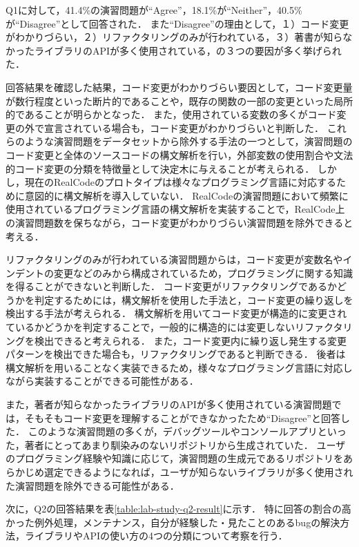 Q1に対して，41.4\%の演習問題が``Agree''，18.1\%が``Neither''，40.5\%が``Disagree''として回答された．
また``Disagree''の理由として，１）コード変更がわかりづらい，２）リファクタリングのみが行われている，３）著書が知らなかったライブラリのAPIが多く使用されている，の３つの要因が多く挙げられた．

回答結果を確認した結果，コード変更がわかりづらい要因として，コード変更量が数行程度といった断片的であることや，既存の関数の一部の変更といった局所的であることが明らかとなった．
また，使用されている変数の多くがコード変更の外で宣言されている場合も，コード変更がわかりづらいと判断した．
これらのような演習問題をデータセットから除外する手法の一つとして，演習問題のコード変更と全体のソースコードの構文解析を行い，外部変数の使用割合や文法的コード変更の分類を特徴量として決定木に与えることが考えられる．
しかし，現在のRealCodeのプロトタイプは様々なプログラミング言語に対応するために意図的に構文解析を導入していない．
RealCodeの演習問題において頻繁に使用されているプログラミング言語の構文解析を実装することで，RealCode上の演習問題数を保ちながら，コード変更がわかりづらい演習問題を除外できると考える．

リファクタリングのみが行われている演習問題からは，コード変更が変数名やインデントの変更などのみから構成されているため，プログラミングに関する知識を得ることができないと判断した．
コード変更がリファクタリングであるかどうかを判定するためには，構文解析を使用した手法と，コード変更の繰り返しを検出する手法が考えられる．
構文解析を用いてコード変更が構造的に変更されているかどうかを判定することで，一般的に構造的には変更しないリファクタリングを検出できると考えられる．
また，コード変更内に繰り返し発生する変更パターンを検出できた場合も，リファクタリングであると判断できる．
後者は構文解析を用いることなく実装できるため，様々なプログラミング言語に対応しながら実装することができる可能性がある．

また，著者が知らなかったライブラリのAPIが多く使用されている演習問題では，そもそもコード変更を理解することができなかったため``Disagree''と回答した．
このような演習問題の多くが，デバッグツールやコンソールアプリといった，著者にとってあまり馴染みのないリポジトリから生成されていた．
ユーザのプログラミング経験や知識に応じて，演習問題の生成元であるリポジトリをあらかじめ選定できるようになれば，ユーザが知らないライブラリが多く使用された演習問題を除外できる可能性がある．

次に，Q2の回答結果を表\ref{table:lab-study-q2-result}に示す．
特に回答の割合の高かった例外処理，メンテナンス，自分が経験した・見たことのあるbugの解決方法，ライブラリやAPIの使い方の4つの分類について考察を行う．



